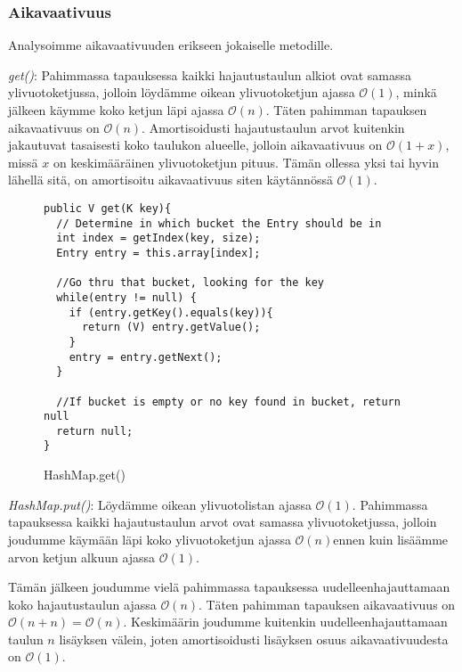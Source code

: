 \documentclass[12pt,a4paper]{article}
\begin{document}
\subsubsection*{Aikavaativuus}

Analysoimme aikavaativuuden erikseen jokaiselle metodille.

\textit{get()}: Pahimmassa tapauksessa kaikki hajautustaulun alkiot ovat samassa ylivuotoketjussa, jolloin löydämme oikean ylivuotoketjun ajassa $\mathcal{O}(1)$, minkä jälkeen käymme koko ketjun läpi ajassa $\mathcal{O}(n)$. Täten pahimman tapauksen aikavaativuus on $\mathcal{O}(n)$. Amortisoidusti hajautustaulun arvot kuitenkin jakautuvat tasaisesti koko taulukon alueelle, jolloin aikavaativuus on $\mathcal{O}(1+x)$, missä $x$ on keskimääräinen ylivuotoketjun pituus. Tämän ollessa yksi tai hyvin lähellä sitä, on amortisoitu aikavaativuus siten käytännössä $\mathcal{O}(1)$.
\begin{figure}[H]
\begin{lstlisting}
public V get(K key){
  // Determine in which bucket the Entry should be in
  int index = getIndex(key, size);
  Entry entry = this.array[index];
        
  //Go thru that bucket, looking for the key
  while(entry != null) {
    if (entry.getKey().equals(key)){
      return (V) entry.getValue();
    }
    entry = entry.getNext();
  }
        
  //If bucket is empty or no key found in bucket, return null
  return null;
}
\end{lstlisting}
\caption{HashMap.get()}
\end{figure}

\textit{HashMap.put()}: Löydämme oikean ylivuotolistan ajassa $\mathcal{O}(1)$. Pahimmassa tapauksessa kaikki hajautustaulun arvot ovat samassa ylivuotoketjussa, jolloin joudumme käymään läpi koko ylivuotoketjun ajassa $\mathcal{O}(n)$ennen kuin lisäämme arvon ketjun alkuun ajassa $\mathcal{O}(1)$. 

Tämän jälkeen joudumme vielä pahimmassa tapauksessa uudelleenhajauttamaan koko hajautustaulun ajassa $\mathcal{O}(n)$. Täten pahimman tapauksen aikavaativuus on $\mathcal{O}(n+n) = \mathcal{O}(n)$. Keskimäärin joudumme kuitenkin uudelleenhajauttamaan taulun $n$ lisäyksen välein, joten amortisoidusti lisäyksen osuus aikavaativuudesta on $\mathcal{O}(1)$.
\end{document}
